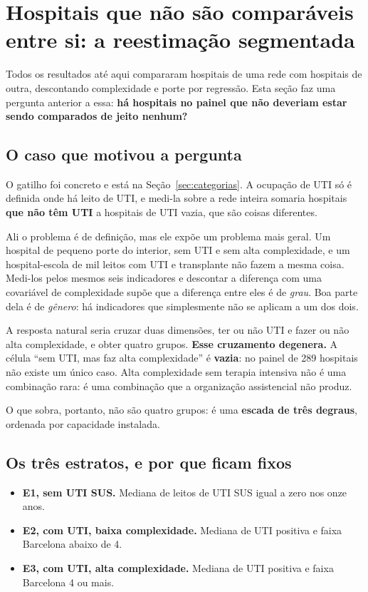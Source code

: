 \section{Hospitais que não são comparáveis entre si: a reestimação
segmentada}
\label{sec:segmentacao}

Todos os resultados até aqui compararam hospitais de uma rede com
hospitais de outra, descontando complexidade e porte por regressão. Esta
seção faz uma pergunta anterior a essa: \textbf{há hospitais no painel que
não deveriam estar sendo comparados de jeito nenhum?}

\subsection{O caso que motivou a pergunta}

O gatilho foi concreto e está na Seção~\ref{sec:categorias}. A ocupação de
UTI só é definida onde há leito de UTI, e medi-la sobre a rede inteira
somaria hospitais \textbf{que não têm UTI} a hospitais de UTI vazia, que são
coisas diferentes.

Ali o problema é de definição, mas ele expõe um problema mais geral. Um
hospital de pequeno porte do interior, sem UTI e sem alta complexidade, e um
hospital-escola de mil leitos com UTI e transplante não fazem a mesma coisa.
Medi-los pelos mesmos seis indicadores e descontar a diferença com uma
covariável de complexidade supõe que a diferença entre eles é de
\emph{grau}. Boa parte dela é de \emph{gênero}: há indicadores que
simplesmente não se aplicam a um dos dois.

A resposta natural seria cruzar duas dimensões, ter ou não UTI e fazer ou
não alta complexidade, e obter quatro grupos. \textbf{Esse cruzamento
degenera.} A célula ``sem UTI, mas faz alta complexidade'' é
\textbf{vazia}: no painel de 289 hospitais não existe um único caso. Alta
complexidade sem terapia intensiva não é uma combinação rara: é uma
combinação que a organização assistencial não produz.

O que sobra, portanto, não são quatro grupos: é uma \textbf{escada de três
degraus}, ordenada por capacidade instalada.

\subsection{Os três estratos, e por que ficam fixos}

\begin{itemize}
\item \textbf{E1, sem UTI SUS.} Mediana de leitos de UTI SUS igual a zero
  nos onze anos.
\item \textbf{E2, com UTI, baixa complexidade.} Mediana de UTI positiva e
  faixa Barcelona abaixo de 4.
\item \textbf{E3, com UTI, alta complexidade.} Mediana de UTI positiva e
  faixa Barcelona 4 ou mais.
\end{itemize}

